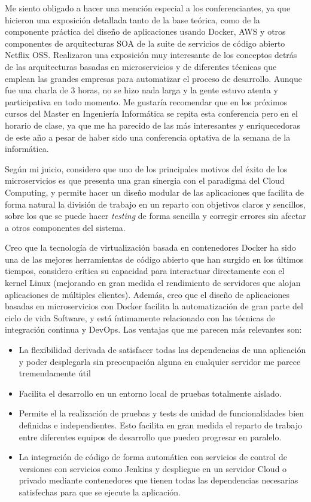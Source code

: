 Me siento obligado a hacer una mención especial a los conferenciantes, ya que hicieron una exposición detallada tanto de la base teórica, como de la componente práctica del diseño de aplicaciones usando Docker, AWS y otros componentes de arquitecturas SOA de la suite de servicios de código abierto Netflix OSS. Realizaron una exposición muy interesante de los conceptos detrás de las arquitecturas basadas en microservicios y de diferentes técnicas que emplean las grandes empresas para automatizar el proceso de desarrollo. Aunque fue una charla de 3 horas, no se hizo nada larga y la gente estuvo atenta y participativa en todo momento. Me gustaría recomendar que en los próximos cursos del Master en Ingeniería Informática se repita esta conferencia pero en el horario de clase, ya que me ha parecido de las más interesantes y enriquecedoras de este año a pesar de haber sido una conferencia optativa de la semana de la informática.

Según mi juicio, considero que uno de los principales motivos del éxito de los microservicios es que presenta una gran sinergia con el paradigma del Cloud Computing, y permite hacer un diseño modular de las aplicaciones que facilita de forma natural la división de trabajo en un reparto con objetivos claros y sencillos, sobre los que se puede hacer \textit{testing} de forma sencilla y corregir errores sin afectar a otros componentes del sistema.

Creo que la tecnología de virtualización basada en contenedores Docker ha sido una de las mejores herramientas de código abierto que han surgido en los últimos tiempos, considero crítica su capacidad para interactuar directamente con el kernel Linux (mejorando en gran medida el rendimiento de servidores que alojan aplicaciones de múltiples clientes). Además, creo que el diseño de aplicaciones basadas en microservicios con Docker facilita la automatización de gran parte del ciclo de vida Software, y está íntimamente relacionado con las técnicas de integración continua y DevOps. Las ventajas que me parecen más relevantes son: 

\begin{itemize}
\item La flexibilidad derivada de satisfacer todas las dependencias de una aplicación y poder desplegarla sin preocupación alguna en cualquier servidor me parece tremendamente útil
\item Facilita el desarrollo en un entorno local de pruebas totalmente aislado.
\item Permite el la realización de pruebas y tests de unidad de funcionalidades bien definidas e independientes. Esto facilita en gran medida el reparto de trabajo entre diferentes equipos de desarrollo que pueden progresar en paralelo.
\item La integración de código de forma automática con servicios de control de versiones con servicios como Jenkins y despliegue en un servidor Cloud o privado mediante contenedores que tienen todas las dependencias necesarias satisfechas para que se ejecute la aplicación.
\end{itemize}

